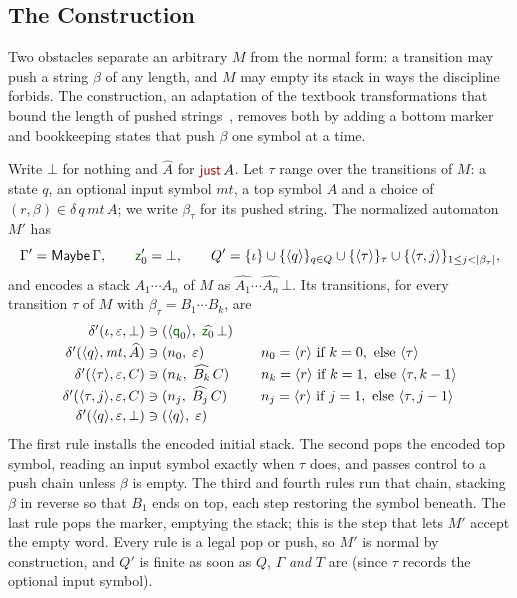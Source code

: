 \documentclass[runningheads]{llncs}
\newcommand{\redFG}[1]{\textcolor[rgb]{0.6,0,0}{#1}}
\newcommand{\greenFG}[1]{\textcolor[rgb]{0,0.4,0}{#1}}
\newcommand{\Con}[1]{{\redFG{\textsf{#1}}}}     %
\newcommand{\F}[1]{{\greenFG{\textsf{#1}}}}     %
\newcommand{\kG}{\ensuremath{\Gamma}}   %
\newcommand{\kmaybe}{\ensuremath{\mathsf{Maybe}}}
\begin{document}
\subsection{The Construction}\label{sec:construction}

Two obstacles separate an arbitrary $M$ from the normal form: a transition may
push a string $\beta$ of any length, and $M$ may empty its stack in ways the
discipline forbids. The construction, an adaptation of the textbook
transformations that bound the length of pushed strings~\cite{hopcroft06,Autebert97},
removes both by adding a bottom marker and bookkeeping states that push $\beta$
one symbol at a time.

Write $\bot$ for \Con{nothing} and $\widehat{A}$ for $\Con{just}\,A$. Let $\tau$
range over the transitions of $M$: a state $q$, an optional input symbol
$\mathit{mt}$, a top symbol $A$ and a choice of
$(r,\beta) \in \delta\,q\,\mathit{mt}\,A$; we write $\beta_\tau$ for its pushed
string. The normalized automaton $M'$ has
\[
\kG' = \kmaybe\,\kG,
\qquad
\F{z}_0' = \bot,
\qquad
Q' = \{\iota\}
   \cup \{\langle q\rangle\}_{q \in Q}
   \cup \{\langle \tau\rangle\}_{\tau}
   \cup \{\langle \tau,j\rangle\}_{1 \leq j < |\beta_\tau|},
\]
and encodes a stack $A_1 \cdots A_n$ of $M$ as
$\widehat{A_1} \cdots \widehat{A_n}\,\bot$. Its transitions, for every
transition $\tau$ of $M$ with $\beta_\tau = B_1 \cdots B_k$, are
\[
\begin{array}{r@{\;\ni\;}l@{\qquad}l}
\delta'(\iota, \varepsilon, \bot)
  & (\langle \F{q}_0\rangle,\; \widehat{\F{z}_0}\,\bot) & \\[2pt]
\delta'(\langle q\rangle, \mathit{mt}, \widehat{A})
  & (n_0,\; \varepsilon)
  & n_0 = \langle r\rangle \text{ if } k = 0, \text{ else } \langle \tau\rangle \\[2pt]
\delta'(\langle \tau\rangle, \varepsilon, C)
  & (n_k,\; \widehat{B_k}\,C)
  & n_k = \langle r\rangle \text{ if } k = 1, \text{ else } \langle \tau,k-1\rangle \\[2pt]
\delta'(\langle \tau,j\rangle, \varepsilon, C)
  & (n_j,\; \widehat{B_j}\,C)
  & n_j = \langle r\rangle \text{ if } j = 1, \text{ else } \langle \tau,j-1\rangle \\[2pt]
\delta'(\langle q\rangle, \varepsilon, \bot)
  & (\langle q\rangle,\; \varepsilon) &
\end{array}
\]
The first rule installs the encoded initial stack. The second pops the encoded
top symbol, reading an input symbol exactly when $\tau$ does, and passes control
to a push chain unless $\beta$ is empty. The third and fourth rules run that
chain, stacking $\beta$ in reverse so that $B_1$ ends on top, each step restoring
the symbol beneath. The last rule pops the marker, emptying the stack; this is
the step that lets $M'$ accept the empty word. Every rule is a legal pop or push,
so $M'$ is normal by construction, and $Q'$ is finite as soon as $Q$, $\kG$
\emph{and} $T$ are (since $\tau$ records the optional input symbol).
\end{document}
